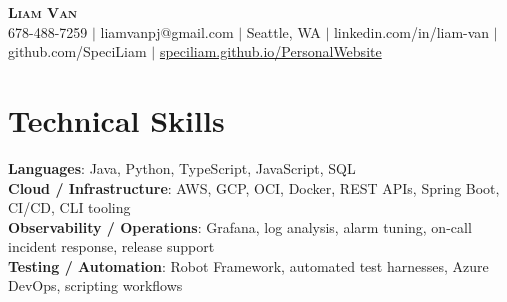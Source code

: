 \documentclass[letterpaper,11pt]{article}
\begin{document}

%
\begin{center}
    \textbf{\Huge \scshape Liam Van} \\ \vspace{1pt}
    \small 678-488-7259 $|$ \small {liamvanpj@gmail.com} $|$ Seattle, WA
 {{$|$ linkedin.com/in/liam-van} {$|$ github.com/SpeciLiam} {$|$ \href{https://speciliam.github.io/PersonalWebsite}{speciliam.github.io/PersonalWebsite}}}

\end{center}

\section{Technical Skills}
 \begin{itemize}[leftmargin=0.15in, label={}]
    \small{\item{
     \textbf{Languages}{: Java, Python, TypeScript, JavaScript, SQL} \\
     \textbf{Cloud / Infrastructure}{: AWS, GCP, OCI, Docker, REST APIs, Spring Boot, CI/CD, CLI tooling} \\
     \textbf{Observability / Operations}{: Grafana, log analysis, alarm tuning, on-call incident response, release support} \\
     \textbf{Testing / Automation}{: Robot Framework, automated test harnesses, Azure DevOps, scripting workflows} \\
    }}
 \end{itemize}
%

\end{document}
